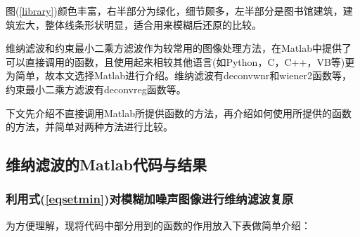 \documentclass[UTF8]{ctexart}
\begin{document}
    图(\ref{library})颜色丰富，右半部分为绿化，细节颇多，左半部分是图书馆建筑，建筑宏大，整体线条形状明显，适合用来模糊后还原的比较。

    维纳滤波和约束最小二乘方滤波作为较常用的图像处理方法，在Matlab中提供了可以直接调用的函数，且使用起来相较其他语言(如Python，C，C++，VB等)更为简单，故本文选择Matlab进行介绍。维纳滤波有{\ttfamily deconvwnr}和{\ttfamily wiener2}函数等，约束最小二乘方滤波有{\ttfamily deconvreg}函数等。

    下文先介绍不直接调用Matlab所提供函数的方法，再介绍如何使用所提供的函数的方法，并简单对两种方法进行比较。
    \subsection{维纳滤波的Matlab代码与结果}
    \subsubsection{利用式(\ref{eqsetmin})对模糊加噪声图像进行维纳滤波复原}
    为方便理解，现将代码中部分用到的函数的作用放入下表做简单介绍：
\end{document}
